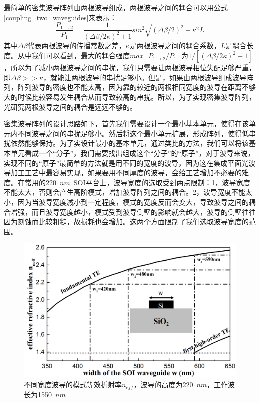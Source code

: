 最简单的密集波导阵列由两根波导组成，两根波导之间的耦合可以用公式\ref{coupling_two_waveguides}来表示\cite{saleh1991fundamentals}：
\begin{equation}
\label{coupling_two_waveguides}
\dfrac{P_{1\rightarrow2}}{P_{1}}=\frac{1}{(\Delta\beta /2\kappa)^2+1}sin^2\sqrt{(\Delta \beta/2)^2 +\kappa^2}L
\end{equation}
其中$\Delta \beta$代表两根波导的传播常数之差，$\kappa$是两根波导之间的耦合系数，$L$是耦合长度。从中我们可以看到，最大的耦合强度$max[P_{1\rightarrow2}/P_{1}]$为$1/[(\Delta\beta/2\kappa)^2 +1]$，所以为了减小两根波导之间的串扰，我们只需要让两根波导相位失配足够严重，即$\Delta\beta>>\kappa$，就能让两根波导的串扰足够小。但是，如果由两根波导组成波导阵列，阵列波导的密度也不能太高，因为靠的较近的两根相同宽度的波导在距离不够大的时候比较容易发生耦合从而导致较高的串扰\cite{song2015high}。所以，为了实现密集波导阵列，光研究两根波导之间的耦合是远远不够的。

密集波导阵列的设计思路如下，首先我们需要设计一个最小基本单元，使得在该单元内不同波导之间的串扰足够小。然后将这个最小单元扩展，形成阵列，使得低串扰依然能够保持。为了实设计最小的基本单元，通过类比的方法，我们可以将该基本单元看成一个“分子”，我们需要找出组成这个“分子”的“原子”，对于波导来说，实现不同的“原子”最简单的方法就是用不同的宽度的波导，因为这在集成平面光波导加工工艺中最容易实现，如果要用不同厚度的波导，会给工艺增加不必要的难度。在常用的220~$nm$~SOI平台上，波导宽度的选取受到两点限制：1，波导宽度不能太大，否则会产生高阶模式，增加波导阵列之间的耦合。2，波导宽度不能太小，因为当波导宽度减小到一定程度，模式的宽度反而会变大，导致波导之间的耦合增强，而且波导宽度越小，模式受到波导侧壁的影响就会越大，波导的侧壁往往因为刻蚀而比较粗糙，故损耗也会增加。这两个方面限制了我们选取波导宽度的范围。

\begin{figure}[htb]
	\centering
	\includegraphics[width=14cm]{./Pictures/edg_refractive_index.jpg}
	\captionsetup{justification=centering}
	\caption{不同宽度波导的模式等效折射率$n_{eff}$，波导的高度为220~$nm$，工作波长为1550~$nm$}
	\label{edg_refractive_index}
\end{figure}

